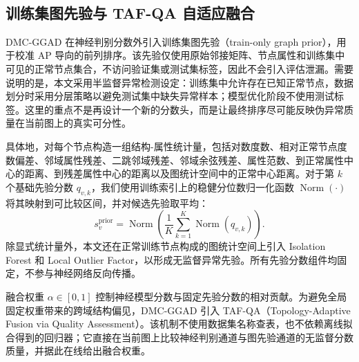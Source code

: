 ﻿﻿﻿﻿    \documentclass[conference, onecolumn]{IEEEtran}
\begin{document}
    \subsection{训练集图先验与 TAF-QA 自适应融合}
    DMC-GGAD 在神经判别分数外引入训练集图先验（train-only graph prior），用于校准 AP 导向的前列排序。该先验仅使用原始邻接矩阵、节点属性和训练集中可见的正常节点集合，不访问验证集或测试集标签，因此不会引入评估泄漏。需要说明的是，本文采用半监督异常检测设定：训练集中允许存在已知正常节点，数据划分时采用分层策略以避免测试集中缺失异常样本；模型优化阶段不使用测试标签。这里的重点不是再设计一个新的分数头，而是让最终排序尽可能反映伪异常质量在当前图上的真实可分性。

    具体地，对每个节点构造一组结构-属性统计量，包括对数度数、相对正常节点度数偏差、邻域属性残差、二跳邻域残差、邻域余弦残差、属性范数、到正常属性中心的距离、到残差属性中心的距离以及图统计空间中的正常中心距离。对于第 $k$ 个基础先验分数 $q_{v,k}$，我们使用训练索引上的稳健分位数归一化函数 $\operatorname{Norm}(\cdot)$ 将其映射到可比较区间，并对候选先验取平均：
    \begin{equation}
    s_v^{\text{prior}} = \operatorname{Norm}\left(\frac{1}{K}\sum_{k=1}^{K}\operatorname{Norm}(q_{v,k})\right).
    \end{equation}
    除显式统计量外，本文还在正常训练节点构成的图统计空间上引入 Isolation Forest 和 Local Outlier Factor，以形成无监督异常先验。所有先验分数组件均固定，不参与神经网络反向传播。

    融合权重 $\alpha \in [0,1]$ 控制神经模型分数与固定先验分数的相对贡献。为避免全局固定权重带来的跨域结构偏见，DMC-GGAD 引入 TAF-QA（Topology-Adaptive Fusion via Quality Assessment）。该机制不使用数据集名称查表，也不依赖离线拟合得到的回归器；它直接在当前图上比较神经判别通道与图先验通道的无监督分数质量，并据此在线给出融合权重。
\end{document}

